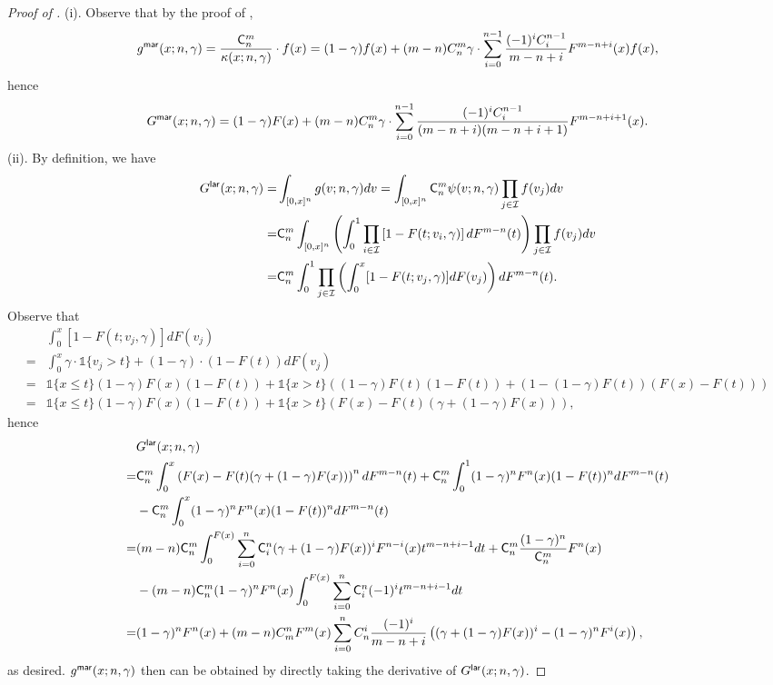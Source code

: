 \begin{proof}[{Proof of }]
(i). Observe that by the proof of , 
\begin{align*}
    g^{\mathsf{mar}}(x ;n,\gamma)
 =
 \frac{\mathsf{C}^m_n}{\kappa(x;n,\gamma)} \cdot f(x) = (1-\gamma)f(x) + (m-n)C^m_n\gamma \cdot \sum_{i=0}^{n-1}\frac{(-1)^iC^{n-1}_i}{m-n+i} F^{m-n+i}(x)f(x),
\end{align*}
hence 
\begin{align*}
   G^{\mathsf{mar}}(x ; n,\gamma)  = (1-\gamma)F(x) + (m-n)C^m_n\gamma \cdot \sum_{i=0}^{n-1}\frac{(-1)^iC^{n-1}_i}{(m-n+i)(m-n+i+1)} F^{m-n+i+1}(x).
 \end{align*}
(ii). By definition, we have 
\begin{align*}
    G^{\mathsf{lar}}(x ; n,\gamma) = &\int_{[0,x]^n} g(v;n,\gamma) dv =  \int_{[0,x]^n}  \mathsf{C}^m_n \psi(v;n,\gamma)
 \prod_{j\in\mathcal{I}} f(v_j)dv\\
  =& \mathsf{C}^m_n \int_{ [0,x]^{n}}  \left(\int_0^1\prod_{i\in \mathcal{I}}\left[1-F(t;v_i,\gamma)\right] dF^{m-n}(t)\right)\prod_{j\in \mathcal{I}} f(v_j) dv\\
 =& \mathsf{C}^m_n\int_0^1 \prod_{j\in \mathcal{I}}\left(\int_0^x [1-F(t;v_j,\gamma)]dF(v_j)\right)dF^{m-n}(t).
\end{align*}
Observe that 
\begin{align*}
&\int_0^x [1-F(t;v_j,\gamma)]dF(v_j) \\= &\int_0^x \gamma \cdot \mathds{1}\{v_j>t\} + (1-\gamma)\cdot (1-F(t))dF(v_j) \\
=&\mathds{1}\{x\leq t\} (1-\gamma)F(x)(1-F(t)) + \mathds{1}\{x> t\}\left((1-\gamma)F(t)(1-F(t)) + \left(1-(1-\gamma)F(t)\right)(F(x) - F(t))\right)
\\
=&\mathds{1}\{x\leq t\} (1-\gamma)F(x)(1-F(t)) + \mathds{1}\{x> t\} \left(F(x) - F(t)(\gamma + (1-\gamma)F(x))\right),
\end{align*}
hence 
\begin{align*}
&G^{\mathsf{lar}}(x; n,\gamma)\\ = &\mathsf{C}^m_n\int_0^x  \left( F(x) - F(t)(\gamma + (1-\gamma)F(x)) \right)^ndF^{m-n}(t) + \mathsf{C}^m_n\int_0^1 (1-\gamma)^nF^n(x)(1-F(t))^n dF^{m-n}(t) \\
& - \mathsf{C}^m_n\int_0^x (1-\gamma)^nF^n(x)(1-F(t))^n dF^{m-n}(t)\\
=& (m-n)\mathsf{C}^m_n\int_0^{F(x)}  \sum_{i=0}^n \mathsf{C}^n_i (\gamma + (1-\gamma)F(x))^{i}F^{n-i}(x) t^{m-n + i-1}dt + \mathsf{C}^m_n\frac{(1-\gamma)^n}{\mathsf{C}^m_n}F^n(x)\\
& - (m-n)\mathsf{C}^m_n(1-\gamma)^n F^n(x) \int_0^{F(x)}  \sum_{i=0}^n \mathsf{C}^n_i (-1)^i t^{m-n+i-1}dt\\
=& (1-\gamma)^nF^n(x) + (m-n)C_m^nF^m(x)\sum_{i=0}^nC_n^i\frac{(-1)^i}{m-n+i}\left((\gamma + (1-\gamma)F(x))^i -(1-\gamma)^nF^i(x)\right),
\end{align*}
as desired. $g^{\mathsf{mar}}(x ;n,\gamma)$ then can be obtained by directly taking the derivative of $G^{\mathsf{lar}}(x; n,\gamma)$.
\end{proof}

